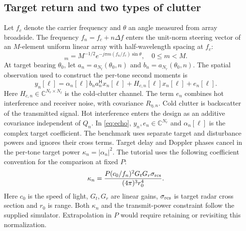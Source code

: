 \documentclass[journal]{IEEEtran}
\newcommand{\Hh}{^{\mathsf H}}
\newcommand{\C}{\mathbb C}
\begin{document}
\subsection{Target return and two types of clutter}
Let $f_c$ denote the carrier frequency and $\theta$ an angle measured from array broadside. The frequency $f_n=f_c+n\Delta f$ enters the unit-norm steering vector of an $M$-element uniform linear array with half-wavelength spacing at $f_c$:
\begin{equation}
 [a_M(\theta,n)]_m=M^{-1/2}e^{-j\pi m(f_n/f_c)\sin\theta},
 \quad 0\le m<M.
\end{equation}
At target bearing $\theta_0$, let $a_n=a_{N_t}(\theta_0,n)$ and $b_n=a_{N_r}(\theta_0,n)$. The spatial observation used to construct the per-tone second moments is
\begin{equation}
 y_n[\ell]=\alpha_n[\ell] b_na_n\Hh x_n[\ell]
             +H_{c,n}[\ell]x_n[\ell]+e_n[\ell]. \label{eq:echo}
\end{equation}
Here $H_{c,n}\in\C^{N_r\times N_t}$ is the cold-clutter channel. The term $e_n$ combines hot interference and receiver noise, with covariance $R_{\eta,n}$. Cold clutter is backscatter of the transmitted signal. Hot interference enters the design as an additive covariance independent of $Q_n$. In \eqref{eq:echo}, $y_n,e_n\in\C^{N_r}$ and $\alpha_n[\ell]$ is the complex target coefficient. The benchmark uses separate target and disturbance powers and ignores their cross terms. Target delay and Doppler phases cancel in the per-tone target power $\kappa_n=|\alpha_n|^2$. The tutorial uses the following coefficient convention for the comparison at fixed $P$:
\begin{equation}
 \kappa_n=\frac{P(c_0/f_n)^2G_tG_r\sigma_{\rm rcs}}
 {(4\pi)^3r_0^4}. \label{eq:radar}
\end{equation}
Here $c_0$ is the speed of light, $G_t,G_r$ are linear gains, $\sigma_{\rm rcs}$ is target radar cross section and $r_0$ is range. Both $\kappa_n$ and the transmit-power constraint follow the supplied simulator. Extrapolation in $P$ would require retaining or revisiting this normalization.
\end{document}
